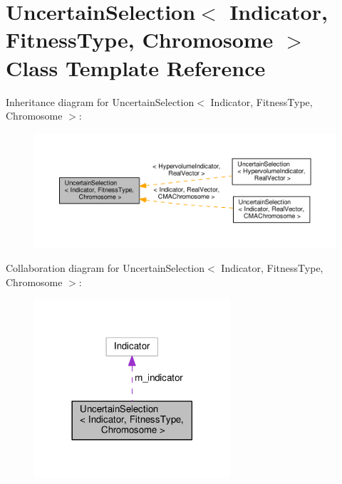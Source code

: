 \hypertarget{classUncertainSelection}{}\section{Uncertain\+Selection$<$ Indicator, Fitness\+Type, Chromosome $>$ Class Template Reference}
\label{classUncertainSelection}


Inheritance diagram for Uncertain\+Selection$<$ Indicator, Fitness\+Type, Chromosome $>$\+:\nopagebreak
\begin{figure}[H]
\begin{center}
\leavevmode
\includegraphics[width=350pt]{classUncertainSelection__inherit__graph}
\end{center}
\end{figure}


Collaboration diagram for Uncertain\+Selection$<$ Indicator, Fitness\+Type, Chromosome $>$\+:\nopagebreak
\begin{figure}[H]
\begin{center}
\leavevmode
\includegraphics[width=206pt]{classUncertainSelection__coll__graph}
\end{center}
\end{figure}
